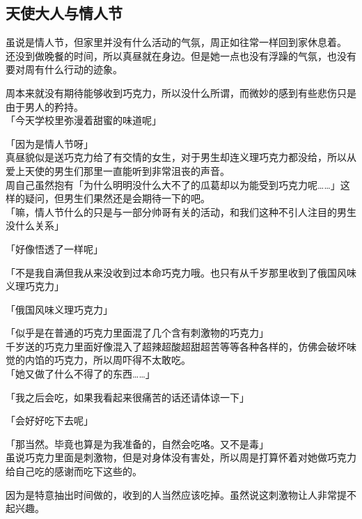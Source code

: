 \subsection{天使大人与情人节}

虽说是情人节，但家里并没有什么活动的气氛，周正如往常一样回到家休息着。\\

还没到做晚餐的时间，所以真昼就在身边。但是她一点也没有浮躁的气氛，也没有要对周有什么行动的迹象。

周本来就没有期待能够收到巧克力，所以没什么所谓，而微妙的感到有些悲伤只是由于男人的矜持。\\

「今天学校里弥漫着甜蜜的味道呢」

「因为是情人节呀」\\

真昼貌似是送巧克力给了有交情的女生，对于男生却连义理巧克力都没给，所以从爱上天使的男生们那里一直能听到非常沮丧的声音。\\

周自己虽然抱有「为什么明明没什么大不了的瓜葛却以为能受到巧克力呢……」这样的疑问，但男生们果然还是会期待一下的吧。\\

「嘛，情人节什么的只是与一部分帅哥有关的活动，和我们这种不引人注目的男生没什么关系」

「好像悟透了一样呢」

「不是我自满但我从来没收到过本命巧克力哦。也只有从千岁那里收到了俄国风味义理巧克力」

「俄国风味义理巧克力」

「似乎是在普通的巧克力里面混了几个含有刺激物的巧克力」\\

千岁送的巧克力里面好像混入了超辣超酸超甜超苦等等各种各样的，仿佛会破坏味觉的内馅的巧克力，所以周吓得不太敢吃。\\

「她又做了什么不得了的东西……」

「我之后会吃，如果我看起来很痛苦的话还请体谅一下」

「会好好吃下去呢」

「那当然。毕竟也算是为我准备的，自然会吃咯。又不是毒」\\

虽说巧克力里面是刺激物，但是对身体没有害处，所以周是打算怀着对她做巧克力给自己吃的感谢而吃下这些的。

因为是特意抽出时间做的，收到的人当然应该吃掉。虽然说这刺激物让人非常提不起兴趣。\\


